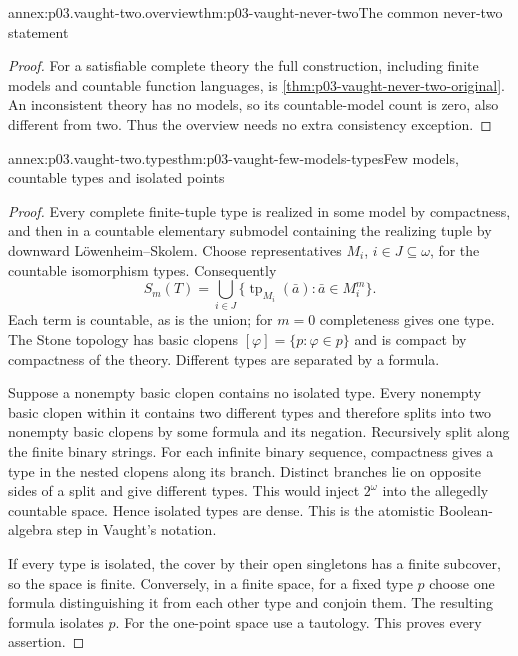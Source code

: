 \begin{annexitem}{annex:p03.vaught-two.overview}{thm:p03-vaught-never-two}{The common never-two statement}
\begin{proof}
For a satisfiable complete theory the full construction, including finite
models and countable function languages, is
\cref{thm:p03-vaught-never-two-original}. An inconsistent theory has no
models, so its countable-model count is zero, also different from two.
Thus the overview needs no extra consistency exception.
\end{proof}
\end{annexitem}

\begin{annexitem}{annex:p03.vaught-two.types}{thm:p03-vaught-few-models-types}{Few models, countable types and isolated points}
\begin{proof}
Every complete finite-tuple type is realized in some model by compactness,
and then in a countable elementary submodel containing the realizing tuple
by downward L\"owenheim--Skolem. Choose representatives \(M_i\),
\(i\in J\subseteq\omega\), for the countable isomorphism types.
Consequently
\[
 S_m(T)=\bigcup_{i\in J}\{\operatorname{tp}_{M_i}(\bar a):
                         \bar a\in M_i^m\}.
\]
Each term is countable, as is the union; for \(m=0\) completeness gives
one type. The Stone topology has basic clopens
\([\varphi]=\{p:\varphi\in p\}\) and is compact by compactness of the
theory. Different types are separated by a formula.

Suppose a nonempty basic clopen contains no isolated type. Every nonempty
basic clopen within it contains two different types and therefore splits
into two nonempty basic clopens by some formula and its negation. Recursively
split along the finite binary strings. For each infinite binary sequence,
compactness gives a type in the nested clopens along its branch. Distinct
branches lie on opposite sides of a split and give different types. This
would inject \(2^\omega\) into the allegedly countable space. Hence
isolated types are dense. This is the atomistic Boolean-algebra step in
Vaught's notation.

If every type is isolated, the cover by their open singletons has a finite
subcover, so the space is finite. Conversely, in a finite space, for a fixed
type \(p\) choose one formula distinguishing it from each other type and
conjoin them. The resulting formula isolates \(p\). For the one-point
space use a tautology. This proves every assertion.
\end{proof}
\end{annexitem}

